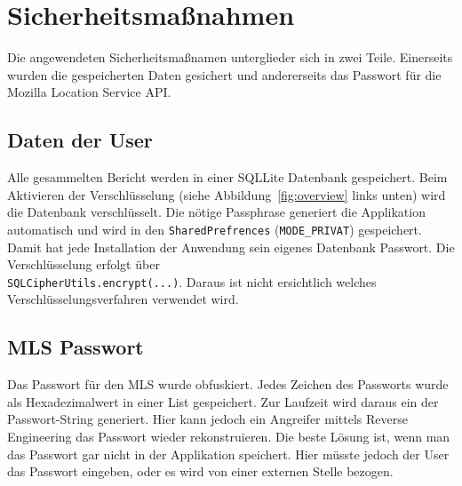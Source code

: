 \section{Sicherheitsmaßnahmen}

Die angewendeten Sicherheitsmaßnamen unterglieder sich in zwei Teile. Einerseits wurden die gespeicherten Daten gesichert und andererseits das Passwort für die Mozilla Location Service API.

\subsection{Daten der User}
Alle gesammelten Bericht werden in einer SQLLite Datenbank gespeichert. Beim Aktivieren der Verschlüsselung (siehe Abbildung~\ref{fig:overview} links unten) wird die Datenbank verschlüsselt. Die nötige Passphrase generiert die Applikation automatisch und wird in den \texttt{SharedPrefrences} (\texttt{MODE\_PRIVAT}) gespeichert. Damit hat jede Installation der Anwendung sein eigenes Datenbank Passwort. Die Verschlüsselung erfolgt über \\ \texttt{SQLCipherUtils.encrypt(...)}. Daraus ist nicht ersichtlich welches Verschlüsselungsverfahren verwendet wird.

\subsection{MLS Passwort}
Das Passwort für den MLS wurde obfuskiert. Jedes Zeichen des Passworts wurde als Hexadezimalwert in einer List gespeichert. Zur Laufzeit wird daraus ein der Passwort-String generiert. Hier kann jedoch ein Angreifer mittels Reverse Engineering das Passwort wieder rekonstruieren. Die beste Lösung ist, wenn man das Passwort gar nicht in der Applikation speichert. Hier müsste jedoch der User das Passwort eingeben, oder es wird von einer externen Stelle bezogen.